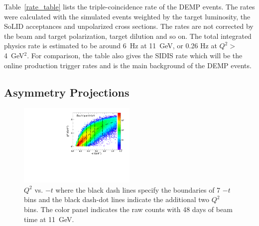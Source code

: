 Table~\ref{rate_table} lists the triple-coincidence rate of the DEMP
events. The rates were calculated with the simulated events weighted by the
target luminosity, the SoLID acceptances and unpolarized cross sections. The
rates are not corrected by the beam and target polarization, target dilution
and so on. The total integrated physics rate is estimated to be around 6~Hz at
11~GeV, or 0.26 Hz at $Q^{2}>$4~GeV$^{2}$.  For comparison, the table also gives the SIDIS rate
which will be the online production trigger rates and is the main background of
the DEMP events.

\subsection{Asymmetry Projections}
\begin{figure}[!ht]
 \begin{center}
      \includegraphics[type=pdf,
        ext=.pdf,read=.pdf,width=0.5\textwidth]{./figures/E11_Q2_t_bin_Fermi} 
    \caption[$Q^{2}$ vs. $-t$]{\footnotesize{$Q^{2}$ vs. $-t$ where the black
dash lines specify the boundaries of 7 $-t$ bins and the black dash-dot lines
indicate the additional two $Q^{2}$ bins.  The color panel indicates the raw
counts with 48 days of beam time at 11~GeV.}}
  \label{Q2_t_bin}
  \end{center}
\end{figure}

